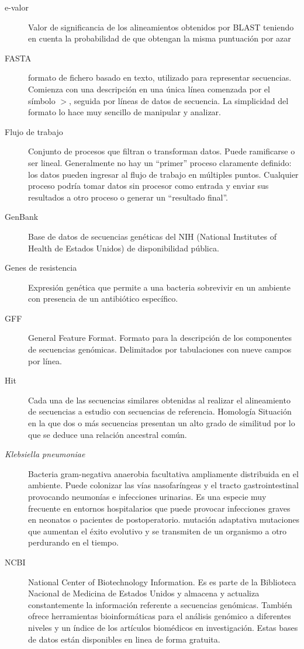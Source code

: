 \begin{description}
\item[e-valor] Valor de significancia de los alineamientos obtenidos por BLAST teniendo en cuenta la probabilidad de que obtengan la misma puntuación por azar 
\item[FASTA] formato de fichero basado en texto, utilizado para representar secuencias. Comienza con una descripción en una única línea comenzada por el símbolo $>$, seguida por líneas de datos de secuencia. La simplicidad del formato lo hace muy sencillo de manipular y analizar.
\item[Flujo de trabajo] Conjunto de procesos que filtran o transforman datos. Puede ramificarse o ser lineal. Generalmente no hay un “primer” proceso claramente definido: los datos pueden ingresar al flujo de trabajo en múltiples puntos. Cualquier proceso podría tomar datos sin procesor como entrada y enviar sus resultados a otro proceso o generar un “resultado final”.
\item[GenBank] Base de datos de secuencias genéticas del NIH (National Institutes of Health de Estados Unidos) de disponibilidad pública. 
\item[Genes de resistencia] Expresión genética que permite a una bacteria sobrevivir en un ambiente con presencia de un antibiótico específico.
\item[GFF] General Feature Format. Formato para la descripción de los componentes de secuencias genómicas. Delimitados por tabulaciones con nueve campos por línea.
\item[Hit] Cada una de las secuencias similares obtenidas al realizar el alineamiento de secuencias a estudio con secuencias de referencia. 
Homología Situación en la que dos o más secuencias presentan un alto grado de similitud por lo que se deduce una relación ancestral común.
\item[\textit{Klebsiella pneumoniae}] Bacteria gram-negativa anaerobia facultativa ampliamente distribuida en el ambiente. Puede colonizar las vías nasofaríngeas y el tracto gastrointestinal provocando neumonías e infecciones urinarias. Es una especie muy frecuente en entornos hospitalarios que puede provocar infecciones graves en neonatos o pacientes de postoperatorio.
mutación adaptativa mutaciones que aumentan el éxito evolutivo y se transmiten de un organismo a otro perdurando en el tiempo.
\item[NCBI] National Center of Biotechnology Information. Es es parte de la Biblioteca Nacional de Medicina de Estados Unidos y almacena y actualiza constantemente la información referente a secuencias genómicas. También ofrece herramientas bioinformáticas para el análisis genómico a diferentes niveles y un índice de los artículos biomédicos en investigación. Estas bases de datos están disponibles en linea de forma gratuita.

\end{description}
